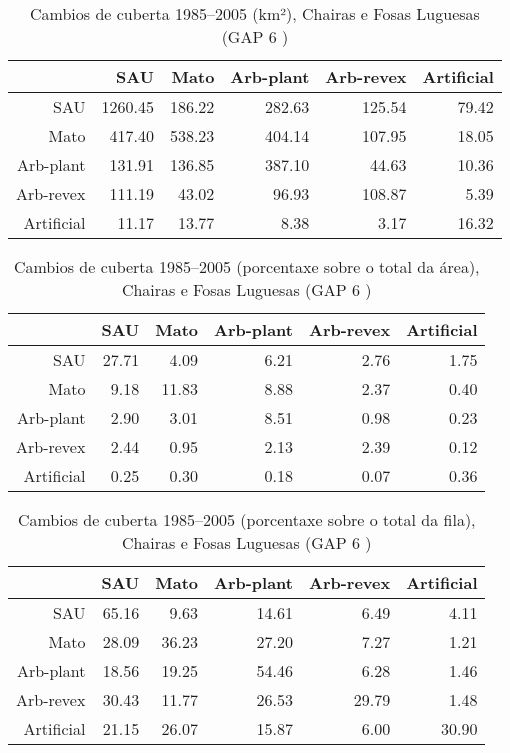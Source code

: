\clearpage
\begin{table}[p]
\centering
\caption{Cambios de cuberta 1985--2005 (km²), Chairas e Fosas Luguesas (GAP 6 )} 
\label{TaboaContinxGAP6}
\begin{tabular}{rrrrrr}
  \hline
 & SAU & Mato & Arb-plant & Arb-revex & Artificial \\ 
  \hline
SAU & 1260.45 & 186.22 & 282.63 & 125.54 & 79.42 \\ 
  Mato & 417.40 & 538.23 & 404.14 & 107.95 & 18.05 \\ 
  Arb-plant & 131.91 & 136.85 & 387.10 & 44.63 & 10.36 \\ 
  Arb-revex & 111.19 & 43.02 & 96.93 & 108.87 & 5.39 \\ 
  Artificial & 11.17 & 13.77 & 8.38 & 3.17 & 16.32 \\ 
   \hline
\end{tabular}
\end{table}
\begin{table}[p]
\centering
\caption{Cambios de cuberta 1985--2005 (porcentaxe sobre o total da área), Chairas e Fosas Luguesas (GAP 6 )} 
\label{TaboaContinxPTGAP6}
\begin{tabular}{rrrrrr}
  \hline
 & SAU & Mato & Arb-plant & Arb-revex & Artificial \\ 
  \hline
SAU & 27.71 & 4.09 & 6.21 & 2.76 & 1.75 \\ 
  Mato & 9.18 & 11.83 & 8.88 & 2.37 & 0.40 \\ 
  Arb-plant & 2.90 & 3.01 & 8.51 & 0.98 & 0.23 \\ 
  Arb-revex & 2.44 & 0.95 & 2.13 & 2.39 & 0.12 \\ 
  Artificial & 0.25 & 0.30 & 0.18 & 0.07 & 0.36 \\ 
   \hline
\end{tabular}
\end{table}
\begin{table}[p]
\centering
\caption{Cambios de cuberta 1985--2005 (porcentaxe sobre o total da fila), Chairas e Fosas Luguesas (GAP 6 )} 
\label{TaboaContinxPFGAP6}
\begin{tabular}{rrrrrr}
  \hline
 & SAU & Mato & Arb-plant & Arb-revex & Artificial \\ 
  \hline
SAU & 65.16 & 9.63 & 14.61 & 6.49 & 4.11 \\ 
  Mato & 28.09 & 36.23 & 27.20 & 7.27 & 1.21 \\ 
  Arb-plant & 18.56 & 19.25 & 54.46 & 6.28 & 1.46 \\ 
  Arb-revex & 30.43 & 11.77 & 26.53 & 29.79 & 1.48 \\ 
  Artificial & 21.15 & 26.07 & 15.87 & 6.00 & 30.90 \\ 
   \hline
\end{tabular}
\end{table}
